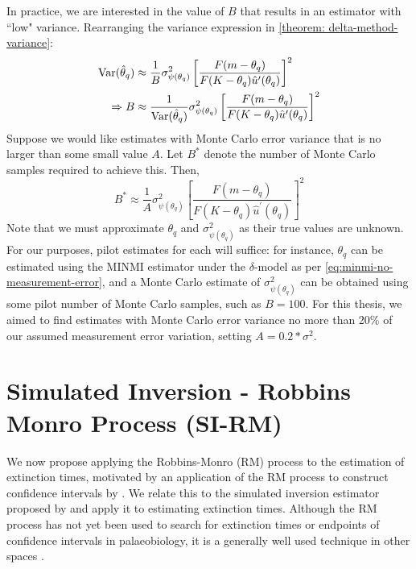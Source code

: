 In practice, we are interested in the value of $B$ that results in an estimator with ``low" variance. Rearranging the variance expression in \autoref{theorem: delta-method-variance}:
\begin{align*}
    \mathrm{Var}(\hat\theta_q) &\approx \frac{1}{B}\sigma^2_{\psi(\theta_q)} \left[ \frac{F(m-\theta_q)}{F(K-\theta_q)\hat{u}^\prime(\theta_q)} \right]^2 \\
    \Rightarrow B &\approx \frac{1}{\mathrm{Var}(\hat\theta_q)}\sigma^2_{\psi(\theta_q)} \left[ \frac{F(m-\theta_q)}{F(K-\theta_q)\hat{u}^\prime(\theta_q)} \right]^2
\end{align*}
Suppose we would like estimates with Monte Carlo error variance that is no larger than some small value $A$. Let $B^*$ denote the number of Monte Carlo samples required to achieve this. Then,
\begin{equation}\label{eqn:minmi-optimal-b}
    B^* \approx \frac{1}{A}\sigma^2_{\psi(\theta_q)} \left[ \frac{F(m-\theta_q)}{F(K-\theta_q)\hat{u}^\prime(\theta_q)} \right]^2
\end{equation}
Note that we must approximate $\theta_q$ and $\sigma^2_{\psi(\theta_q)}$ as their true values are unknown. For our purposes, pilot estimates for each will suffice: for instance, $\theta_q$ can be estimated using the MINMI estimator under the $\delta$-model as per \autoref{eq:minmi-no-measurement-error}, and a Monte Carlo estimate of $\sigma^2_{\psi(\theta_q)}$ can be obtained using some pilot number of Monte Carlo samples, such as $B=100$. For this thesis, we aimed to find estimates with Monte Carlo error variance no more than 20\% of our assumed measurement error variation, setting $A = 0.2*\sigma^2$.

\section{Simulated Inversion - Robbins Monro Process (SI-RM)}

We now propose applying the Robbins-Monro (RM) process to the estimation of extinction times, motivated by an application of the RM process to construct confidence intervals by \citet{Garthwaite1992}. We relate this to the simulated inversion estimator proposed by \citet{Huang2019} and apply it to estimating extinction times. Although the RM process has not yet been used to search for extinction times or endpoints of confidence intervals in palaeobiology, it is a generally well used technique in other spaces \cite{Carpenter1999, Fisher2020, Fu2015}.


